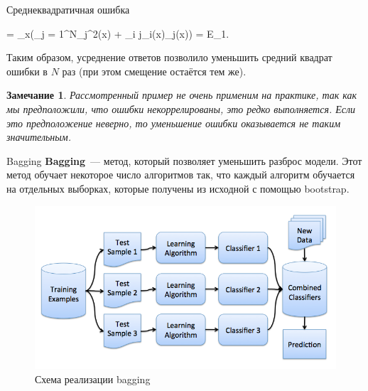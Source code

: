 \documentclass[notheorems, handout]{beamer}
\newtheorem{remark}{Замечание}
\begin{document}
\begin{frame}{Среднеквадратичная ошибка}
	\begin{flalign*}
		= _{x}\left(\displaystyle\sum_{j = 1}^{N}\varepsilon_{j}^{2}(x) + \displaystyle\sum_{i \neq j}\varepsilon_{i}(x)\varepsilon_{j}(x)\right) = E_{1}.
	\end{flalign*}
	\par\smallskip
	Таким образом, усреднение ответов позволило уменьшить средний квадрат ошибки в $N$ раз (при этом смещение остаётся тем же).
	\par\smallskip
	\begin{remark}
		Рассмотренный пример не очень применим на практике, так как мы предположили, что ошибки некоррелированы, это редко выполняется.  Если это предположение неверно, то уменьшение ошибки оказывается не таким значительным.
	\end{remark}
\end{frame}

\begin{frame}{Bagging}
	\textbf{Bagging}~--- метод, который позволяет уменьшить разброс модели. Этот метод обучает некоторое число алгоритмов так, что каждый алгоритм обучается на отдельных выборках, которые получены из исходной с помощью bootstrap.
	\begin{figure}[h!]
	\includegraphics[width=0.9 \textwidth]{img/bagging}
	\caption{Схема реализации bagging}
\end{figure}

\end{frame}
\end{document}
